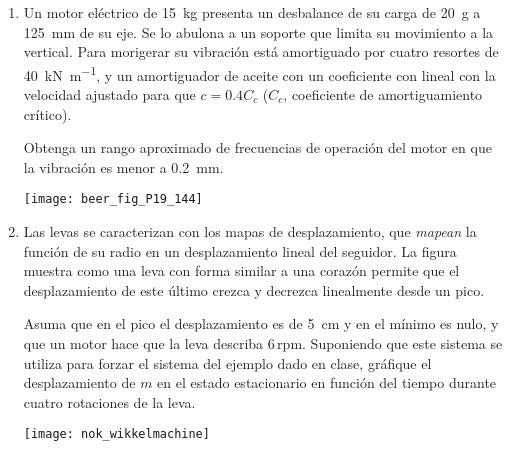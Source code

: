 \documentclass[11pt,spanish,a4paper]{article}
\begin{document}
\begin{enumerate}
\item 
\begin{minipage}[t][3.5cm]{0.75\textwidth}
Un motor eléctrico de \SI{15}{\kilo\gram} presenta un desbalance de su carga de \SI{20}{\gram} a \SI{125}{\milli\metre} de su eje.
Se lo abulona a un soporte que limita su movimiento a la vertical.
Para morigerar su vibración está amortiguado por cuatro resortes de \SI{40}{\kilo\newton\per\metre}, y un amortiguador de aceite con un coeficiente con lineal con la velocidad ajustado para que $c = 0.4 C_c$ ($C_c$, coeficiente de amortiguamiento crítico).

Obtenga un rango aproximado de frecuencias de operación del motor en que la vibración es menor a \SI{0.2}{\milli\metre}.
\end{minipage}
\begin{minipage}[c][2cm][t]{0.2\textwidth}
	\texttt{[image: beer\_fig\_P19\_144]}
\end{minipage}



\item 
\begin{minipage}[t][3.5cm]{0.75\textwidth}
Las levas se caracterizan con los mapas de desplazamiento, que \emph{mapean} la función de su radio en un desplazamiento lineal del seguidor.
La figura muestra como una leva con forma similar a una corazón permite que el desplazamiento de este último crezca y decrezca linealmente desde un pico.
				
Asuma que en el pico el desplazamiento es de \SI{5}{\centi\metre} y en el mínimo es nulo, y que un motor hace que la leva describa $6\,\mathrm{rpm}$.  
Suponiendo que este sistema se utiliza para forzar el sistema del ejemplo dado en clase, gráfique el desplazamiento de $m$ en el estado estacionario en función del tiempo durante cuatro rotaciones de la leva.
\end{minipage}
\begin{minipage}[c][2cm][t]{0.2\textwidth}
	\texttt{[image: nok\_wikkelmachine]}
\end{minipage}




\end{enumerate}
\end{document}
